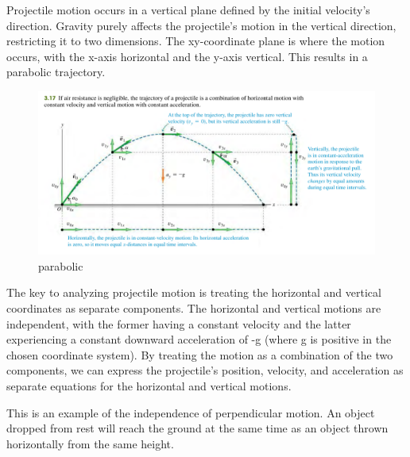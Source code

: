 \documentclass[11pt]{article}
\begin{document}
Projectile motion occurs in a vertical plane defined by the initial
velocity's direction. Gravity purely affects the projectile's motion in
the vertical direction, restricting it to two dimensions. The
xy-coordinate plane is where the motion occurs, with the x-axis
horizontal and the y-axis vertical. This results in a parabolic
trajectory.

\begin{figure}
\centering
\includegraphics{images/parabolic_path.png}
\caption{parabolic}
\end{figure}

The key to analyzing projectile motion is treating the horizontal and
vertical coordinates as separate components. The horizontal and vertical
motions are independent, with the former having a constant velocity and
the latter experiencing a constant downward acceleration of -g (where g
is positive in the chosen coordinate system). By treating the motion as
a combination of the two components, we can express the projectile's
position, velocity, and acceleration as separate equations for the
horizontal and vertical motions.

This is an example of the independence of perpendicular motion. An
object dropped from rest will reach the ground at the same time as an
object thrown horizontally from the same height.
\end{document}
